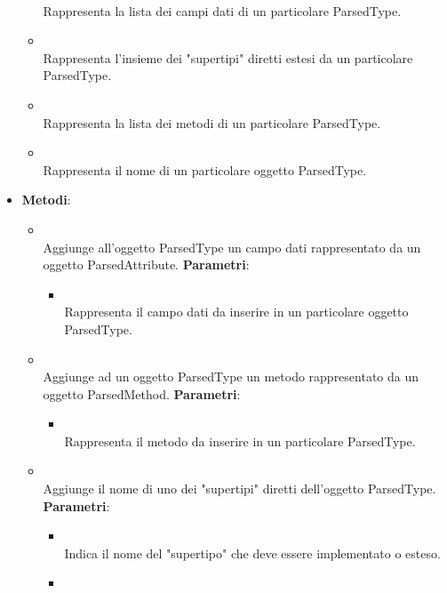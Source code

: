 \begin{itemize}
\begin{itemize}
\\ Rappresenta la lista dei campi dati di un particolare ParsedType.
\item {}
\\ Rappresenta l'insieme dei "supertipi" diretti estesi da un particolare ParsedType.
\item {}
\\ Rappresenta la lista dei metodi di un particolare ParsedType.
\item {}
\\ Rappresenta il nome di un particolare oggetto ParsedType.
\end{itemize}
\item \textbf{Metodi}:
\begin{itemize}
\item {}
\\ Aggiunge all'oggetto ParsedType un campo dati rappresentato da un oggetto ParsedAttribute.
\textbf{Parametri}:
\begin{itemize}
\item {}
\\ Rappresenta il campo dati da inserire in un particolare oggetto ParsedType.
\end{itemize}
\item {}
\\ Aggiunge ad un oggetto ParsedType un metodo rappresentato da un oggetto ParsedMethod.
\textbf{Parametri}:
\begin{itemize}
\item {}
\\ Rappresenta il metodo da inserire in un particolare ParsedType.
\end{itemize}
\item {}
\\ Aggiunge il nome di uno dei "supertipi" diretti dell'oggetto ParsedType.
\textbf{Parametri}:
\begin{itemize}
\item {}
\\ Indica il nome del "supertipo" che deve essere implementato o esteso.
\item {}

\end{itemize}
\end{itemize}
\end{itemize}

